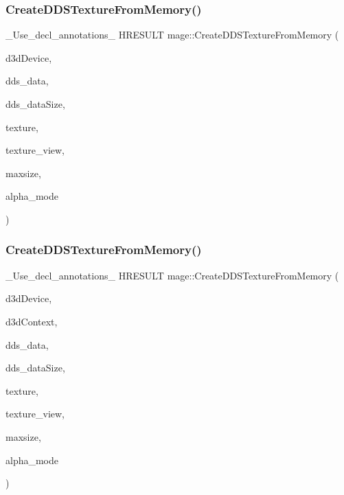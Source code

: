 \subsubsection{\texorpdfstring{Create\+D\+D\+S\+Texture\+From\+Memory()}{CreateDDSTextureFromMemory()}\hspace{0.1cm}{\footnotesize\ttfamily [3/4]}}
{\footnotesize\ttfamily \+\_\+\+Use\+\_\+decl\+\_\+annotations\+\_\+ H\+R\+E\+S\+U\+LT mage\+::\+Create\+D\+D\+S\+Texture\+From\+Memory (\begin{DoxyParamCaption}\item[{I\+D3\+D11\+Device $\ast$}]{d3d\+Device,  }\item[{const uint8\+\_\+t $\ast$}]{dds\+\_\+data,  }\item[{size\+\_\+t}]{dds\+\_\+data\+Size,  }\item[{I\+D3\+D11\+Resource $\ast$$\ast$}]{texture,  }\item[{I\+D3\+D11\+Shader\+Resource\+View $\ast$$\ast$}]{texture\+\_\+view,  }\item[{size\+\_\+t}]{maxsize,  }\item[{\hyperlink{namespacemage_a0c586a2bad862f4858900ca121ca80c2}{D\+D\+S\+\_\+\+A\+L\+P\+H\+A\+\_\+\+M\+O\+DE} $\ast$}]{alpha\+\_\+mode }\end{DoxyParamCaption})}

\hypertarget{namespacemage_a9b5a7a7773e9f46894c7180ddd34b2ce}{}\label{namespacemage_a9b5a7a7773e9f46894c7180ddd34b2ce} 
\subsubsection{\texorpdfstring{Create\+D\+D\+S\+Texture\+From\+Memory()}{CreateDDSTextureFromMemory()}\hspace{0.1cm}{\footnotesize\ttfamily [4/4]}}
{\footnotesize\ttfamily \+\_\+\+Use\+\_\+decl\+\_\+annotations\+\_\+ H\+R\+E\+S\+U\+LT mage\+::\+Create\+D\+D\+S\+Texture\+From\+Memory (\begin{DoxyParamCaption}\item[{I\+D3\+D11\+Device $\ast$}]{d3d\+Device,  }\item[{I\+D3\+D11\+Device\+Context $\ast$}]{d3d\+Context,  }\item[{const uint8\+\_\+t $\ast$}]{dds\+\_\+data,  }\item[{size\+\_\+t}]{dds\+\_\+data\+Size,  }\item[{I\+D3\+D11\+Resource $\ast$$\ast$}]{texture,  }\item[{I\+D3\+D11\+Shader\+Resource\+View $\ast$$\ast$}]{texture\+\_\+view,  }\item[{size\+\_\+t}]{maxsize,  }\item[{\hyperlink{namespacemage_a0c586a2bad862f4858900ca121ca80c2}{D\+D\+S\+\_\+\+A\+L\+P\+H\+A\+\_\+\+M\+O\+DE} $\ast$}]{alpha\+\_\+mode }\end{DoxyParamCaption})}

